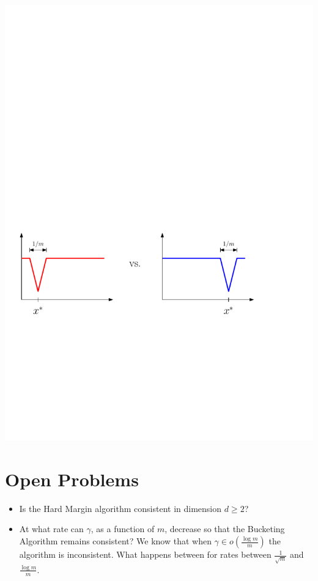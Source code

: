 \documentclass[largefonts,landscape]{sciposter}
\begin{document}
\begin{multicols}{3}
\begin{center}
\includegraphics[scale=2]{uniform-conv}
\end{center}

\section*{Open Problems}

\begin{itemize}
\item Is the Hard Margin algorithm consistent in dimension $d \ge 2$?

\item At what rate can $\gamma$, as a function of $m$, decrease so that the Bucketing Algorithm remains consistent?
We know that when $\gamma \in o(\frac{\log m}{m})$ the algorithm is inconsistent. What happens between for rates between $\frac{1}{\sqrt{m}}$
and $\frac{\log m}{m}$.
\end{itemize}


%
%

\end{multicols}
\end{document}
